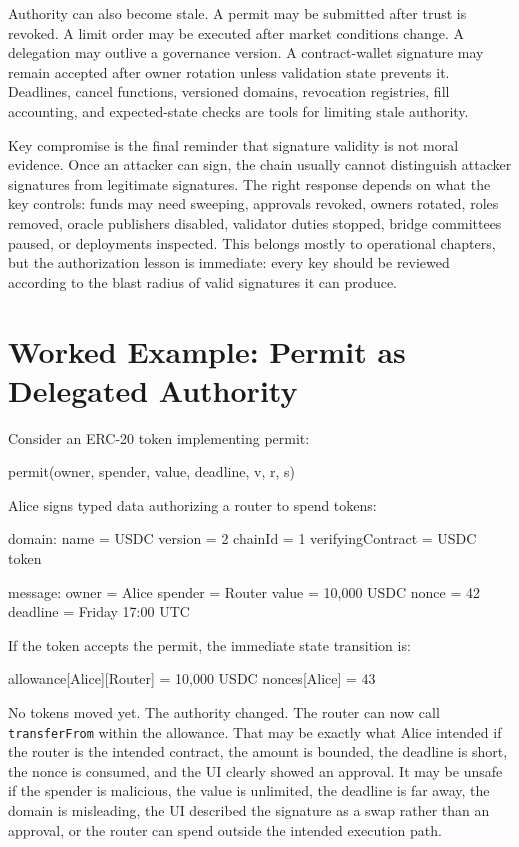 Authority can also become stale. A permit may be submitted after trust is revoked. A limit order may be executed after market conditions change. A delegation may outlive a governance version. A contract-wallet signature may remain accepted after owner rotation unless validation state prevents it. Deadlines, cancel functions, versioned domains, revocation registries, fill accounting, and expected-state checks are tools for limiting stale authority.

Key compromise is the final reminder that signature validity is not moral evidence. Once an attacker can sign, the chain usually cannot distinguish attacker signatures from legitimate signatures. The right response depends on what the key controls: funds may need sweeping, approvals revoked, owners rotated, roles removed, oracle publishers disabled, validator duties stopped, bridge committees paused, or deployments inspected. This belongs mostly to operational chapters, but the authorization lesson is immediate: every key should be reviewed according to the blast radius of valid signatures it can produce.

\section{Worked Example: Permit as Delegated Authority}

Consider an ERC-20 token implementing permit:

\begin{codeblock}
permit(owner, spender, value, deadline, v, r, s)
\end{codeblock}

Alice signs typed data authorizing a router to spend tokens:

\begin{codeblock}
domain:
    name = USDC
    version = 2
    chainId = 1
    verifyingContract = USDC token

message:
    owner = Alice
    spender = Router
    value = 10,000 USDC
    nonce = 42
    deadline = Friday 17:00 UTC
\end{codeblock}

If the token accepts the permit, the immediate state transition is:

\begin{codeblock}
allowance[Alice][Router] = 10,000 USDC
nonces[Alice] = 43
\end{codeblock}

No tokens moved yet. The authority changed. The router can now call \texttt{transferFrom} within the allowance. That may be exactly what Alice intended if the router is the intended contract, the amount is bounded, the deadline is short, the nonce is consumed, and the UI clearly showed an approval. It may be unsafe if the spender is malicious, the value is unlimited, the deadline is far away, the domain is misleading, the UI described the signature as a swap rather than an approval, or the router can spend outside the intended execution path.

